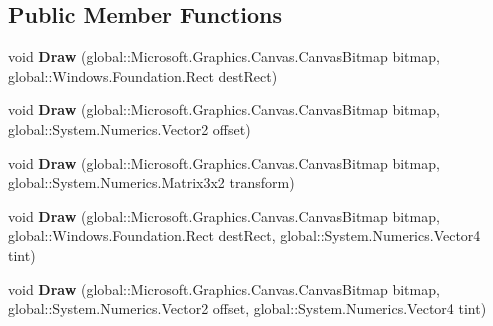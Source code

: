 \subsection*{Public Member Functions}
\begin{DoxyCompactItemize}
\item 
\mbox{\label{interface_microsoft_1_1_graphics_1_1_canvas_1_1_i_canvas_sprite_batch_a523bb7703d792520261dec0792f80b61}} 
void {\bfseries Draw} (global\+::\+Microsoft.\+Graphics.\+Canvas.\+Canvas\+Bitmap bitmap, global\+::\+Windows.\+Foundation.\+Rect dest\+Rect)
\item 
\mbox{\label{interface_microsoft_1_1_graphics_1_1_canvas_1_1_i_canvas_sprite_batch_a772228b4cde10ff970a8e93625163bd8}} 
void {\bfseries Draw} (global\+::\+Microsoft.\+Graphics.\+Canvas.\+Canvas\+Bitmap bitmap, global\+::\+System.\+Numerics.\+Vector2 offset)
\item 
\mbox{\label{interface_microsoft_1_1_graphics_1_1_canvas_1_1_i_canvas_sprite_batch_ab0083cf0eb076b27d60e179234004436}} 
void {\bfseries Draw} (global\+::\+Microsoft.\+Graphics.\+Canvas.\+Canvas\+Bitmap bitmap, global\+::\+System.\+Numerics.\+Matrix3x2 transform)
\item 
\mbox{\label{interface_microsoft_1_1_graphics_1_1_canvas_1_1_i_canvas_sprite_batch_a858a891f85b1b06333536091c54eefac}} 
void {\bfseries Draw} (global\+::\+Microsoft.\+Graphics.\+Canvas.\+Canvas\+Bitmap bitmap, global\+::\+Windows.\+Foundation.\+Rect dest\+Rect, global\+::\+System.\+Numerics.\+Vector4 tint)
\item 
\mbox{\label{interface_microsoft_1_1_graphics_1_1_canvas_1_1_i_canvas_sprite_batch_a74de3e1e7c2648ca4c114b88d8751e12}} 
void {\bfseries Draw} (global\+::\+Microsoft.\+Graphics.\+Canvas.\+Canvas\+Bitmap bitmap, global\+::\+System.\+Numerics.\+Vector2 offset, global\+::\+System.\+Numerics.\+Vector4 tint)
\item 
\mbox{\label{interface_microsoft_1_1_graphics_1_1_canvas_1_1_i_canvas_sprite_batch_a43b4642b34dc5a505f5641f8ff427b90}} 

\end{DoxyCompactItemize}
